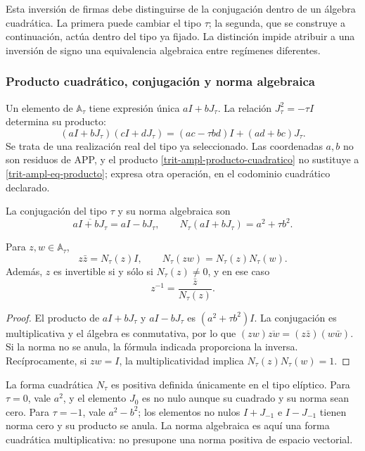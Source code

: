 Esta inversión de firmas debe distinguirse de la conjugación dentro de un
álgebra cuadrática. La primera puede cambiar el tipo \(\tau\); la segunda,
que se construye a continuación, actúa dentro del tipo ya fijado. La
distinción impide atribuir a una inversión de signo una equivalencia
algebraica entre regímenes diferentes.

\subsubsection{Producto cuadrático, conjugación y norma algebraica}
\label{trit-ampl-norma}

Un elemento de \(\mathbb A_\tau\) tiene expresión única \(aI+bJ_\tau\).
La relación \(J_\tau^2=-\tau I\) determina su producto:
\begin{equation}
 (aI+bJ_\tau)(cI+dJ_\tau)
   =(ac-\tau bd)I+(ad+bc)J_\tau.
 \label{trit-ampl-producto-cuadratico}
\end{equation}
Se trata de una realización real del tipo ya seleccionado. Las coordenadas
\(a,b\) no son residuos de APP, y el producto
\eqref{trit-ampl-producto-cuadratico} no sustituye a
\eqref{trit-ampl-eq-producto}; expresa otra operación, en el codominio
cuadrático declarado.

\begin{definition}
\label{trit-ampl-def-norma}
La conjugación del tipo \(\tau\) y su norma algebraica son
\[
 \overline{aI+bJ_\tau}=aI-bJ_\tau,\qquad
 N_\tau(aI+bJ_\tau)=a^2+\tau b^2.
\]
\end{definition}

\begin{proposition}
\label{trit-ampl-prop-norma}
Para \(z,w\in\mathbb A_\tau\),
\[
 z\bar z=N_\tau(z)I,\qquad
 N_\tau(zw)=N_\tau(z)N_\tau(w).
\]
Además, \(z\) es invertible si y sólo si \(N_\tau(z)\ne0\), y en ese caso
\[
 z^{-1}=\frac{\bar z}{N_\tau(z)}.
\]
\end{proposition}
\begin{proof}
El producto de \(aI+bJ_\tau\) y \(aI-bJ_\tau\) es
\((a^2+\tau b^2)I\). La conjugación es multiplicativa y el álgebra es
conmutativa, por lo que
\((zw)\overline{zw}=(z\bar z)(w\bar w)\). Si la norma no se anula, la
fórmula indicada proporciona la inversa. Recíprocamente, si \(zw=I\), la
multiplicatividad implica \(N_\tau(z)N_\tau(w)=1\).
\end{proof}

La forma cuadrática \(N_\tau\) es positiva definida únicamente en el tipo elíptico.
Para \(\tau=0\), vale \(a^2\), y el elemento \(J_0\) es no nulo aunque su
cuadrado y su norma sean cero. Para \(\tau=-1\), vale \(a^2-b^2\); los
elementos no nulos \(I+J_{-1}\) e \(I-J_{-1}\) tienen norma cero y su
producto se anula. La norma algebraica es aquí una forma cuadrática
multiplicativa: no presupone una norma positiva de espacio vectorial.

